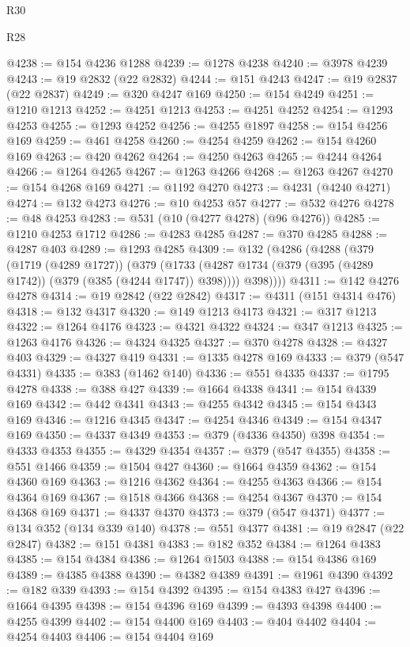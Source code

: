 \begin{lexlean}{R30}
\begin{lexlean}{R28}
\begin{coremodule}
{{{{{{{{{{{{{{{{{{{{{{{{{{{{{{{{{{{{{{{{{{{{{{{{{{{{{{{{{{{{{{{{{{{{{{{{{{{{{{{{{{{{{{{{{{{{{{{{{{{{{{{{{{{{{{{{{{{{{{{{{{{{{{{{{{{{{{{{{{{{{{{@4238 := @154 @4236 @1288
@4239 := @1278 @4238
@4240 := @3978 @4239
@4243 := @19 @2832 (@22 @2832)
@4244 := @151 @4243
@4247 := @19 @2837 (@22 @2837)
@4249 := @320 @4247 @169
@4250 := @154 @4249
@4251 := @1210 @1213
@4252 := @4251 @1213
@4253 := @4251 @4252
@4254 := @1293 @4253
@4255 := @1293 @4252
@4256 := @4255 @1897
@4258 := @154 @4256 @169
@4259 := @461 @4258
@4260 := @4254 @4259
@4262 := @154 @4260 @169
@4263 := @420 @4262
@4264 := @4250 @4263
@4265 := @4244 @4264
@4266 := @1264 @4265
@4267 := @1263 @4266
@4268 := @1263 @4267
@4270 := @154 @4268 @169
@4271 := @1192 @4270
@4273 := @4231 (@4240 @4271)
@4274 := @132 @4273
@4276 := @10 @4253 @57
@4277 := @532 @4276
@4278 := @48 @4253
@4283 := @531 (@10 (@4277 @4278) (@96 @4276))
@4285 := @1210 @4253 @1712
@4286 := @4283 @4285
@4287 := @370 @4285
@4288 := @4287 @403
@4289 := @1293 @4285
@4309 := @132
    (@4286
      (@4288
        (@379
          (@1719 (@4289 @1727))
          (@379
            (@1733 (@4287 @1734 (@379 (@395 (@4289 @1742)) (@379 (@385 (@4244 @1747)) @398))))
            @398))))
@4311 := @142 @4276 @4278
@4314 := @19 @2842 (@22 @2842)
@4317 := @4311 (@151 @4314 @476)
@4318 := @132 @4317
@4320 := @149 @1213 @4173
@4321 := @317 @1213
@4322 := @1264 @4176
@4323 := @4321 @4322
@4324 := @347 @1213
@4325 := @1263 @4176
@4326 := @4324 @4325
@4327 := @370 @4278
@4328 := @4327 @403
@4329 := @4327 @419
@4331 := @1335 @4278 @169
@4333 := @379 (@547 @4331)
@4335 := @383 (@1462 @140)
@4336 := @551 @4335
@4337 := @1795 @4278
@4338 := @388 @427
@4339 := @1664 @4338
@4341 := @154 @4339 @169
@4342 := @442 @4341
@4343 := @4255 @4342
@4345 := @154 @4343 @169
@4346 := @1216 @4345
@4347 := @4254 @4346
@4349 := @154 @4347 @169
@4350 := @4337 @4349
@4353 := @379 (@4336 @4350) @398
@4354 := @4333 @4353
@4355 := @4329 @4354
@4357 := @379 (@547 @4355)
@4358 := @551 @1466
@4359 := @1504 @427
@4360 := @1664 @4359
@4362 := @154 @4360 @169
@4363 := @1216 @4362
@4364 := @4255 @4363
@4366 := @154 @4364 @169
@4367 := @1518 @4366
@4368 := @4254 @4367
@4370 := @154 @4368 @169
@4371 := @4337 @4370
@4373 := @379 (@547 @4371)
@4377 := @134 @352 (@134 @339 @140)
@4378 := @551 @4377
@4381 := @19 @2847 (@22 @2847)
@4382 := @151 @4381
@4383 := @182 @352
@4384 := @1264 @4383
@4385 := @154 @4384
@4386 := @1264 @1503
@4388 := @154 @4386 @169
@4389 := @4385 @4388
@4390 := @4382 @4389
@4391 := @1961 @4390
@4392 := @182 @339
@4393 := @154 @4392
@4395 := @154 @4383 @427
@4396 := @1664 @4395
@4398 := @154 @4396 @169
@4399 := @4393 @4398
@4400 := @4255 @4399
@4402 := @154 @4400 @169
@4403 := @404 @4402
@4404 := @4254 @4403
@4406 := @154 @4404 @169
}}}}}}}}}}}}}}}}}}}}}}}}}}}}}}}}}}}}}}}}}}}}}}}}}}}}}}}}}}}}}}}}}}}}}}}}}}}}}}}}}}}}}}}}}}}}}}}}}}}}}}}}}}}}}}}}}}}}}}}}}}}}}}}}}}}}}}}}}}}}}}}
\end{coremodule}
\end{lexlean}
\end{lexlean}
